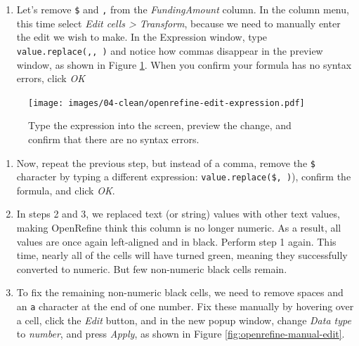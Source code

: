 \documentclass[
  english,
]{book}
\providecommand{\tightlist}{%
  \setlength{\itemsep}{0pt}\setlength{\parskip}{0pt}}
\begin{document}
\begin{enumerate}
\def\labelenumi{\arabic{enumi}.}
\setcounter{enumi}{1}
\tightlist
\item
  Let's remove \texttt{\$} and \texttt{,} from the \emph{FundingAmount} column. In the column menu, this time select \emph{Edit cells \textgreater{} Transform}, because we need to manually enter the edit we wish to make. In the Expression window, type \texttt{value.replace(\textquotesingle{},\textquotesingle{},\ \textquotesingle{}\textquotesingle{})} and notice how commas
  disappear in the preview window, as shown in Figure \ref{fig:openrefine-edit-expression}. When you confirm your formula has no syntax errors, click \emph{OK}
\end{enumerate}



\begin{figure}
\centering
\texttt{[image: images/04-clean/openrefine-edit-expression.pdf]}
\caption{\label{fig:openrefine-edit-expression}Type the expression into the screen, preview the change, and confirm that there are no syntax errors.}
\end{figure}

\begin{enumerate}
\def\labelenumi{\arabic{enumi}.}
\setcounter{enumi}{2}
\item
  Now, repeat the previous step, but instead of a comma, remove the \texttt{\$} character by typing a different expression: \texttt{value.replace(\textquotesingle{}\$\textquotesingle{},\ \textquotesingle{}\textquotesingle{})}), confirm the formula, and click \emph{OK}.
\item
  In steps 2 and 3, we replaced text (or string) values with other text values,
  making OpenRefine think this column is no longer numeric. As a result, all values
  are once again left-aligned and in black. Perform step 1 again. This time, nearly all of the cells will have turned green, meaning they successfully converted to numeric. But few non-numeric black cells remain.
\item
  To fix the remaining non-numeric black cells, we need to remove spaces and an \texttt{a} character at the end of one number. Fix these manually by hovering over a cell, click the \emph{Edit} button, and in the new popup window, change \emph{Data type} to \emph{number}, and press \emph{Apply}, as shown in Figure \ref{fig:openrefine-manual-edit}.
\end{enumerate}
\end{document}
